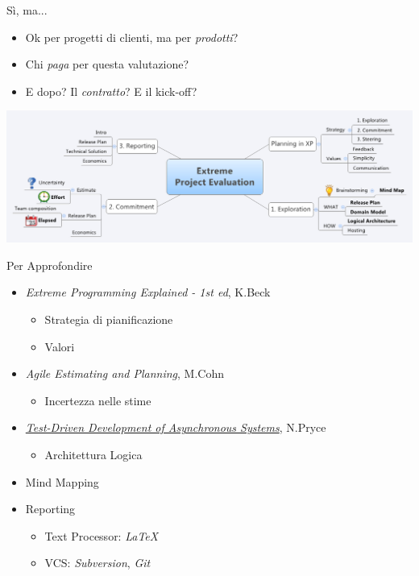 \documentclass[compress, red, 14pt]{beamer}
\newcommand{\highlight}[1]{{\color{purple} \emph{#1}}}
\begin{document}
	\begin{frame}{Sì, ma...}
		\begin{itemize}
			\item Ok per progetti di clienti, ma per \highlight{prodotti}?
			\item Chi \highlight{paga} per questa valutazione?
			\item E dopo? Il \highlight{contratto}? E il kick-off?
		\end{itemize}
		\begin{center}
			\hspace*{-0.6cm}
			\includegraphics[scale=0.31]{images/takeaway.png}
		\end{center}
	\end{frame}
	
	\begin{frame}{Per Approfondire}
		\begin{itemize}
			\item {\small \highlight{Extreme Programming Explained - 1st ed}, K.Beck}
			\begin{itemize}
				\item Strategia di pianificazione
				\item Valori
			\end{itemize}
			
			\item {\small \highlight{Agile Estimating and Planning}, M.Cohn}
			\begin{itemize}
				\item Incertezza nelle stime
			\end{itemize}
			
			\item {\footnotesize \highlight{\href{http://www.natpryce.com/articles/000755.html}{Test-Driven Development of Asynchronous Systems}}}{\small , N.Pryce}
				\begin{itemize}
					\item Architettura Logica
				\end{itemize}
		\end{itemize}
		
		\begin{itemize}
			\item Mind Mapping
			\item Reporting
			\begin{itemize}
				\item Text Processor: \highlight{LaTeX}
				\item VCS: \highlight{Subversion}, \highlight{Git}
			\end{itemize}
		\end{itemize}
	\end{frame}
\end{document}
